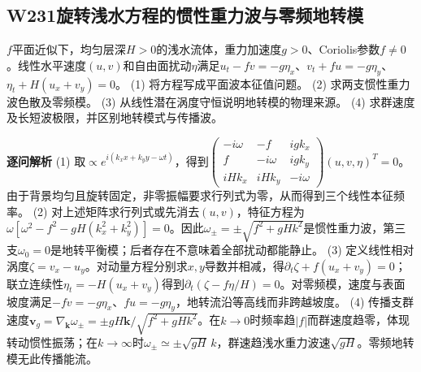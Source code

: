 \subsection*{W231\quad 旋转浅水方程的惯性重力波与零频地转模}
$f$平面近似下，均匀层深$H>0$的浅水流体，重力加速度$g>0$、Coriolis参数$f\ne0$。线性水平速度$(u,v)$和自由面扰动$\eta$满足$u_t-fv=-g\eta_x$、$v_t+fu=-g\eta_y$、$\eta_t+H(u_x+v_y)=0$。
(1) 将方程写成平面波本征值问题。
(2) 求两支惯性重力波色散及零频模。
(3) 从线性潜在涡度守恒说明地转模的物理来源。
(4) 求群速度及长短波极限，并区别地转模式与传播波。
\par\textbf{逐问解析}
(1) 取$\propto e^{i(k_xx+k_yy-\omega t)}$，得到$\begin{pmatrix}-i\omega&-f&igk_x\\f&-i\omega&igk_y\\iHk_x&iHk_y&-i\omega\end{pmatrix}(u,v,\eta)^T=0$。由于背景均匀且旋转固定，非零振幅要求行列式为零，从而得到三个线性本征频率。
(2) 对上述矩阵求行列式或先消去$(u,v)$，特征方程为$\omega[\omega^2-f^2-gH(k_x^2+k_y^2)]=0$。因此$\omega_\pm=\pm\sqrt{f^2+gHk^2}$是惯性重力波，第三支$\omega_0=0$是地转平衡模；后者存在不意味着全部扰动都能静止。
(3) 定义线性相对涡度$\zeta=v_x-u_y$。对动量方程分别求$x,y$导数并相减，得$\partial_t\zeta+f(u_x+v_y)=0$；联立连续性$\eta_t=-H(u_x+v_y)$得到$\partial_t(\zeta-f\eta/H)=0$。对零频模，速度与表面坡度满足$-fv=-g\eta_x$、$fu=-g\eta_y$，地转流沿等高线而非跨越坡度。
(4) 传播支群速度$\boldsymbol v_g=\nabla_{\boldsymbol k}\omega_\pm=\pm gH\boldsymbol k/\sqrt{f^2+gHk^2}$。在$k\to0$时频率趋$|f|$而群速度趋零，体现转动惯性振荡；在$k\to\infty$时$\omega_\pm\simeq\pm\sqrt{gH}\,k$，群速趋浅水重力波速$\sqrt{gH}$。零频地转模无此传播能流。
\par\medskip

